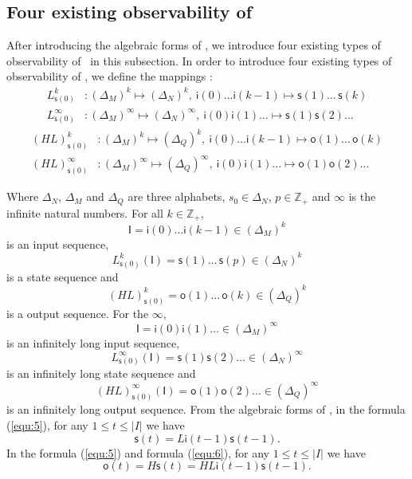 \subsection{Four existing observability of \BCNs}
After introducing the algebraic forms of \BCNs, we introduce four existing types of observability of \BCNs\ in this subsection. In order to introduce four existing types of observability of \BCNs, we define the mappings \cite{Zhang2016Observability}:
\begin{equation}
\begin{split}
L^k_{\mathsf{s}(0)} &: (\Delta_M)^k\mapsto(\Delta_N)^k,\ \mathsf{i}(0)\ldots \mathsf{i}({k-1}) \mapsto \mathsf{s}(1) \ldots\, \mathsf{s}(k)\\
L^{\infty}_{\mathsf{s}(0)} &: (\Delta_M)^{\infty}\mapsto(\Delta_N)^{\infty},\ \mathsf{i}(0) \mathsf{i}(1) \ldots  \mapsto \mathsf{s}(1) \mathsf{s}(2) \ldots
\end{split}
\label{equ:5}
\end{equation}
\begin{equation}
\begin{split}
(HL)^k_{\mathsf{s}(0)} &: (\Delta_M)^k\mapsto(\Delta_Q)^k,\ \mathsf{i}(0)\ldots \mathsf{i}(k-1) \mapsto \mathsf{o}(1)\ldots\, \mathsf{o}(k)\\
(HL)^{\infty}_{\mathsf{s}(0)} &: (\Delta_M)^{\infty}\mapsto(\Delta_Q)^{\infty},\ \mathsf{i}(0) \mathsf{i}(1) \ldots  \mapsto \mathsf{o}(1) \mathsf{o}(2)\ldots
\end{split}
\label{equ:6}
\end{equation}

Where $\Delta_N$, $\Delta_M$ and $\Delta_Q$ are three alphabets, $s_0\in \Delta_N$, $p\in \mathbb{Z}_+$ and $\infty$ is the infinite natural numbers. For all  $k\in \mathbb{Z}_+$, 
\[\mathsf{I}=\mathsf{i}(0)\ldots \mathsf{i}({k-1}) \in(\Delta_M)^k\] 
is an input sequence, 
\[L^k_{\mathsf{s}(0)}(\mathsf{I})=\mathsf{s}(1) \ldots\, \mathsf{s}(p) \in(\Delta_N)^k\]
 is a state sequence and 
 \[(HL)^k_{\mathsf{s}(0)}=\mathsf{o}(1)\ldots\, \mathsf{o}(k) \in(\Delta_Q)^k\] 
 is a output sequence. For the $\infty$, 
 \[\mathsf{I}=\mathsf{i}(0) \mathsf{i}(1)\ldots  \in(\Delta_M)^{\infty}\] 
 is an infinitely long input sequence, 
 \[L^{\infty}_{\mathsf{s}(0)}(\mathsf{I})=\mathsf{s}(1) \mathsf{s}(2)\ldots  \in(\Delta_N)^{\infty}\] 
 is an infinitely long state sequence and 
 \[(HL)^{\infty}_{\mathsf{s}(0)}(\mathsf{I})=\mathsf{o}(1) \mathsf{o}(2)\ldots \in(\Delta_Q)^{\infty}\]
  is an infinitely long output sequence. From the algebraic forms of \BCNs, in the formula (\ref{equ:5}), for any $1\le t \le |I|$ we have 
 \[\mathsf{s}(t)=L\mathsf{i}({t-1})\mathsf{s}({t-1}).\] 
 In the formula (\ref{equ:5}) and formula (\ref{equ:6}), for any $1\le t \le |I|$ we have  
 \[\mathsf{o}(t)=H\mathsf{s}(t)=HL\mathsf{i}({t-1})\mathsf{s}({t-1}).\] 

